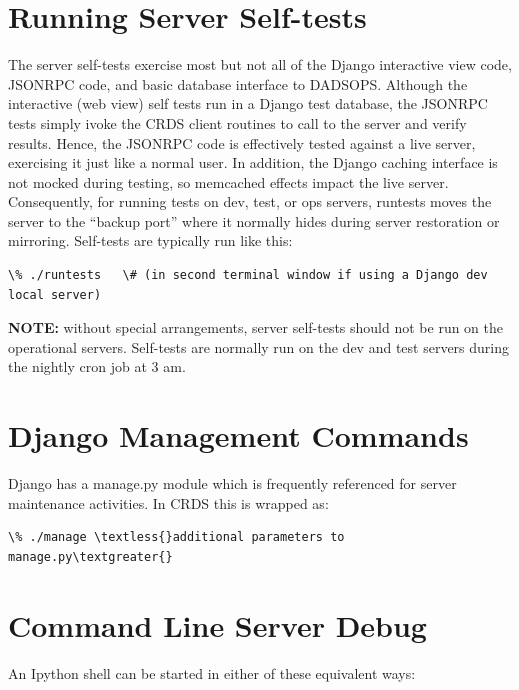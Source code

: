 \documentclass[letterpaper,10pt,english]{sphinxmanual}
\begin{document}
\section{Running Server Self-tests}
\label{server_guide:running-server-self-tests}
The server self-tests exercise most but not all of the Django interactive view code,  JSONRPC code, and basic database
interface to DADSOPS.   Although the interactive (web view) self tests run in a Django test database,  the JSONRPC
tests simply ivoke the CRDS client routines to call to the server and verify results.   Hence,  the JSONRPC code
is effectively tested against a live server,  exercising it just like a normal user.  In addition,  the Django
caching interface is not mocked during testing,  so memcached effects impact the live server.   Consequently,  for
running tests on dev, test, or ops servers,  runtests moves the server to the ``backup port'' where it normally hides
during server restoration or mirroring.   Self-tests are typically run like this:

\begin{Verbatim}[commandchars=\\\{\}]
\% ./runtests   \# (in second terminal window if using a Django dev local server)
\end{Verbatim}

\textbf{NOTE:}    without special arrangements,  server self-tests should not be run on the operational servers.
Self-tests are normally run on the dev and test servers during the nightly cron job at 3 am.


\section{Django Management Commands}
\label{server_guide:django-management-commands}
Django has a manage.py module which is frequently referenced for server maintenance activities.   In CRDS this is
wrapped as:

\begin{Verbatim}[commandchars=\\\{\}]
\% ./manage \textless{}additional parameters to manage.py\textgreater{}
\end{Verbatim}


\section{Command Line Server Debug}
\label{server_guide:command-line-server-debug}
An Ipython shell can be started in either of these equivalent ways:
\end{document}
